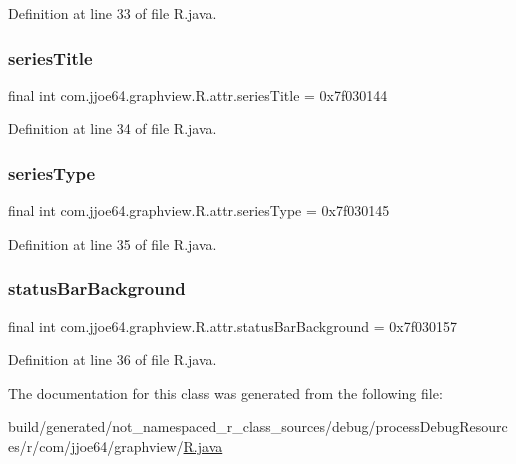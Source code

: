 Definition at line 33 of file R.\+java.

\mbox{\label{classcom_1_1jjoe64_1_1graphview_1_1_r_1_1attr_a69a11fac8bffce2531cb2506da58f3ad}} 
\subsubsection{\texorpdfstring{seriesTitle}{seriesTitle}}
{\footnotesize\ttfamily final int com.\+jjoe64.\+graphview.\+R.\+attr.\+series\+Title = 0x7f030144\hspace{0.3cm}{\ttfamily [static]}}



Definition at line 34 of file R.\+java.

\mbox{\label{classcom_1_1jjoe64_1_1graphview_1_1_r_1_1attr_a22906eee4b28b40bc14ce32410ac7ee3}} 
\subsubsection{\texorpdfstring{seriesType}{seriesType}}
{\footnotesize\ttfamily final int com.\+jjoe64.\+graphview.\+R.\+attr.\+series\+Type = 0x7f030145\hspace{0.3cm}{\ttfamily [static]}}



Definition at line 35 of file R.\+java.

\mbox{\label{classcom_1_1jjoe64_1_1graphview_1_1_r_1_1attr_aacda7c55a6f17a953acfa1be99d02510}} 
\subsubsection{\texorpdfstring{statusBarBackground}{statusBarBackground}}
{\footnotesize\ttfamily final int com.\+jjoe64.\+graphview.\+R.\+attr.\+status\+Bar\+Background = 0x7f030157\hspace{0.3cm}{\ttfamily [static]}}



Definition at line 36 of file R.\+java.



The documentation for this class was generated from the following file\+:\begin{DoxyCompactItemize}
\item 
build/generated/not\+\_\+namespaced\+\_\+r\+\_\+class\+\_\+sources/debug/process\+Debug\+Resources/r/com/jjoe64/graphview/\mbox{\hyperlink{com_2jjoe64_2graphview_2_r_8java}{R.\+java}}\end{DoxyCompactItemize}
